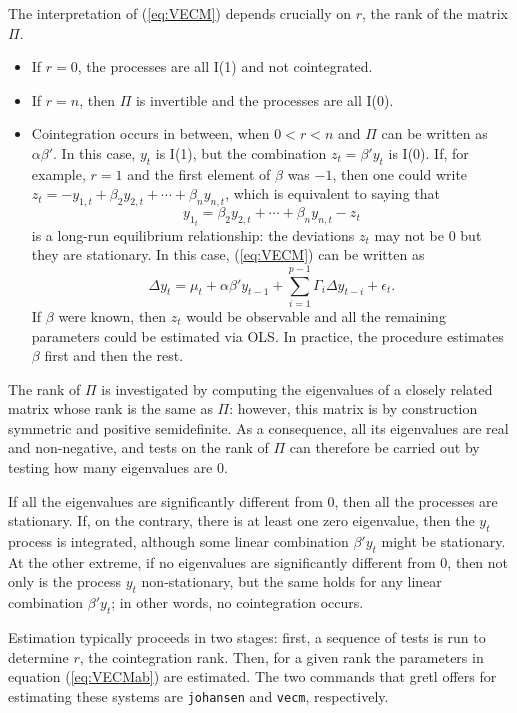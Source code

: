 The interpretation of (\ref{eq:VECM}) depends crucially on $r$, the rank of
the matrix $\Pi$.
\begin{itemize}
\item If $r = 0$, the processes are all I(1) and not cointegrated.
\item If $r = n$, then $\Pi$ is invertible and the processes are all I(0).
\item Cointegration occurs in between, when $0 < r < n$ and $\Pi$ can
  be written as $\alpha \beta'$. In this case, $y_t$ is I(1), but the
  combination $z_t = \beta'y_t$ is I(0). If, for example, $r=1$ and
  the first element of $\beta$ was $-1$, then one could write $z_t =
  -y_{1,t} + \beta_2 y_{2,t} + \cdots + \beta_n y_{n,t}$, which is
  equivalent to saying that
  \[
    y_{1_t} = \beta_2 y_{2,t} + \cdots + \beta_n y_{n,t} - z_t
  \]
  is a long-run equilibrium relationship: the deviations $z_t$
  may not be 0 but they are stationary. In this case, (\ref{eq:VECM})
  can be written as 
  \begin{equation}
    \label{eq:VECMab}
    \Delta y_t = \mu_t + \alpha \beta' y_{t-1} + \sum_{i=1}^{p-1} \Gamma_i 
    \Delta y_{t-i} + \epsilon_t .
  \end{equation}
  If $\beta$ were known, then $z_t$ would be observable and all the
  remaining parameters could be estimated via OLS.  In practice, the
  procedure estimates $\beta$ first and then the rest.
\end{itemize}

The rank of $\Pi$ is investigated by computing the eigenvalues of a
closely related matrix whose rank is the same as $\Pi$: however, this
matrix is by construction symmetric and positive semidefinite.  As a
consequence, all its eigenvalues are real and non-negative, and tests
on the rank of $\Pi$ can therefore be carried out by testing how many
eigenvalues are 0.

If all the eigenvalues are significantly different from 0, then all
the processes are stationary. If, on the contrary, there is at least
one zero eigenvalue, then the $y_t$ process is integrated, although
some linear combination $\beta'y_t$ might be stationary. At the other
extreme, if no eigenvalues are significantly different from 0, then
not only is the process $y_t$ non-stationary, but the same holds for
any linear combination $\beta'y_t$; in other words, no cointegration
occurs.

Estimation typically proceeds in two stages: first, a sequence of
tests is run to determine $r$, the cointegration rank. Then, for a
given rank the parameters in equation (\ref{eq:VECMab}) are estimated.
The two commands that gretl offers for estimating these systems
are \texttt{johansen} and \texttt{vecm}, respectively.

